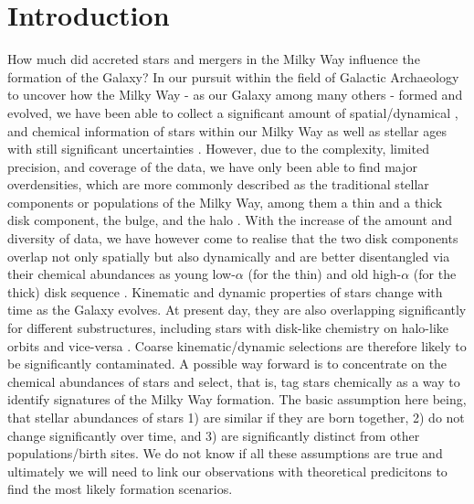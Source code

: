 \documentclass[fleqn,usenatbib]{mnras}
\begin{document}



\section{Introduction} \label{sec:introduction}

How much did accreted stars and mergers in the Milky Way influence the formation of the Galaxy? In our pursuit within the field of Galactic Archaeology to uncover how the Milky Way - as our Galaxy among many others - formed and evolved, we have been able to collect a significant amount of spatial/dynamical \citep[e.g.][]{Brown2021}, and chemical information \citep{Jofre2019} of stars within our Milky Way as well as stellar ages with still significant uncertainties \citep{Soderblom2010}. However, due to the complexity, limited precision, and coverage of the data, we have only been able to find major overdensities, which are more commonly described as the traditional stellar components or populations of the Milky Way, among them a thin and a thick disk component, the bulge, and the halo \citep[see.e.g.][for a review]{BlandHawthorn_Gerhard2016}. With the increase of the amount and diversity of data, we have however come to realise that the two disk components overlap not only spatially but also dynamically \citep[e.g.][]{Bovy2012b} and are better disentangled via their chemical abundances as young low-$\alpha$ (for the thin) and old high-$\alpha$ (for the thick) disk sequence \citep[e.g.][]{Buder2019, BlandHawthorn2019}. Kinematic and dynamic properties of stars change with time as the Galaxy evolves. At present day, they are also overlapping significantly for different substructures, including stars with disk-like chemistry on halo-like orbits and vice-versa \citep[e.g.][]{Belokurov2020, Sestito2020}. Coarse kinematic/dynamic selections are therefore likely to be significantly contaminated. A possible way forward is to concentrate on the chemical abundances of stars and select, that is, tag stars chemically \citep[see e.g.][for a review on chemical tagging]{FreemanBlandHawthorn2002} as a way to identify signatures of the Milky Way formation. The basic assumption here being, that stellar abundances of stars 1) are  similar if they are born together, 2) do not change significantly over time, and 3) are significantly distinct from other populations/birth sites. We do not know if all these assumptions are true \citep{Bovy2016b, Ness2018, Ness2019b} and ultimately we will need to link our observations with theoretical predicitons to find the most likely formation scenarios. 
\end{document}
